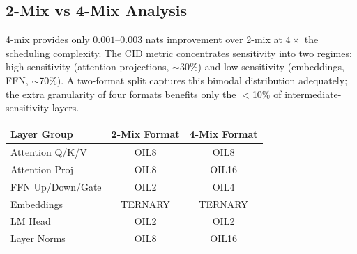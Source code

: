 \subsection{2-Mix vs 4-Mix Analysis}
4-mix provides only $0.001$--$0.003$ nats improvement over 2-mix at $4\times$ the scheduling
complexity. The CID metric concentrates sensitivity into two regimes: high-sensitivity
(attention projections, $\sim$30\%) and low-sensitivity (embeddings, FFN, $\sim$70\%). A
two-format split captures this bimodal distribution adequately; the extra granularity of
four formats benefits only the $<$10\% of intermediate-sensitivity layers.
\begin{center}
\begin{tabular}{lcc}
\toprule
\textbf{Layer Group} & \textbf{2-Mix Format} & \textbf{4-Mix Format} \\
\midrule
Attention Q/K/V   & OIL8   & OIL8 \\
Attention Proj    & OIL8   & OIL16 \\
FFN Up/Down/Gate  & OIL2   & OIL4 \\
Embeddings        & TERNARY & TERNARY \\
LM Head           & OIL2   & OIL2 \\
Layer Norms       & OIL8   & OIL16 \\
\bottomrule
\end{tabular}
\end{center}
\begin{table}[h]
\centering
\caption{Per-layer format assignment for 2-mix and 4-mix on the 256M model.}
\label{tab:mix_comparison}
\end{table}
